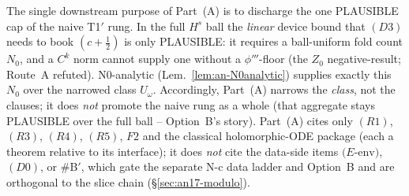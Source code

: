 \begin{remark}\label{rem:an17-what-A-buys}
The single downstream purpose of Part~(A) is to discharge the one
PLAUSIBLE cap of the naive T1$'$ rung.  In the full $H^s$ ball the
\emph{linear} device bound that $(D3)$ needs to book $(c+\tfrac12)$ is
only PLAUSIBLE: it requires a ball-uniform fold count $N_0$, and a $C^k$
norm cannot supply one without a $\phi'''$-floor (the $Z_0$
negative-result; Route~A refuted).  N0-analytic
(Lem.~\ref{lem:an-N0analytic}) supplies exactly this $N_0$ over the
narrowed class $U_\omega$.  Accordingly, Part~(A) narrows the
\emph{class}, not the clauses; it does \emph{not} promote the naive rung
as a whole (that aggregate stays PLAUSIBLE over the full ball -- Option~B's
story).  Part~(A) cites only $(R1)$, $(R3)$, $(R4)$, $(R5)$, $F2$ and the
classical holomorphic-ODE package (each a theorem relative to its
interface); it does \emph{not} cite the data-side items $(E$-$\mathrm{env})$,
$(D0)$, or \#B$'$, which gate the separate N-c data ladder and Option~B and
are orthogonal to the slice chain (\S\ref{sec:an17-modulo}).
\end{remark}

